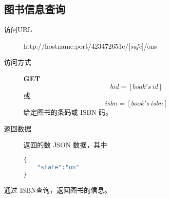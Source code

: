 \documentclass[UTF8]{article}
\def\safe{/[\textit{safe}]}
\def\GET{\colorbox[rgb]{0.77,0.53,0.97}{\textbf{GET}}}
\def\viaurl{\item[{\quad\colorbox[rgb]{0.47,0.88,0.89}{访问URL}}]}
\def\viareq#1{\item[{\quad\colorbox[rgb]{0.57,0.88,0.99}{访问方式}}] #1}
\def\rtdata{\item[{\quad\colorbox[rgb]{0.70,0.9,0.59}{返回数据}}]}
\begin{document}
        \subsection{图书信息查询}
        \begin{description}
	        \viaurl http://hostname:port/423472651c\safe/ons
	        \viareq{\GET}
	        $$bid=[book's\,id]$$
	        或
	        $$isbn=[book's\,isbn]$$
	        给定图书的条码或 ISBN 码。
	        \rtdata 返回的数 JSON 数据，其中
	        \begin{lstlisting}[language=JavaScript]
{
	"state":"on"
}
	        \end{lstlisting}
	         \end{description}
                通过 ISBN查询，返回图书的信息。
\end{document}
